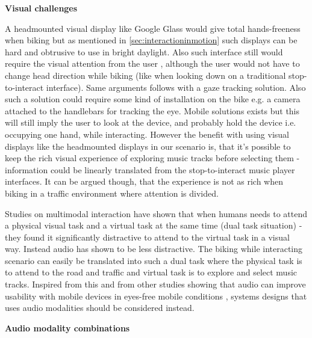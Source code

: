 \textbf{Visual challenges}

A headmounted visual display like Google Glass would give total hands-freeness when biking but as mentioned in \ref{sec:interactioninmotion} such displays can be hard and obtrusive to use in bright daylight. Also such interface still would require the visual attention from the user \cite{geelhoed_safety_2000}, although the user would not have to change head direction while biking (like when looking down on a traditional stop-to-interact interface). Same arguments follows with a gaze tracking solution. Also such a solution could require some kind of installation on the bike e.g. a camera attached to the handlebars for tracking the eye. Mobile solutions exists \cite{mardanbegi_eye-based_2012} but this will still imply the user to look at the device, and probably hold the device i.e. occupying one hand, while interacting. However the benefit with using visual displays like the headmounted displays in our scenario is, that it's possible to keep the rich visual experience of exploring music tracks before selecting them - information could be linearly translated from the stop-to-interact music player interfaces. It can be argued though, that the experience is not as rich when biking in a traffic environment where attention is divided.

Studies on multimodal interaction \cite{zhao_shared_2013} have shown that when humans needs to attend a physical visual task and a virtual task at the same time (dual task situation) - they found it significantly distractive to attend to the virtual task in a visual way. Instead audio has shown to be less distractive. The biking while interacting scenario can easily be translated into such a dual task where the physical task is to attend to the road and traffic and virtual task is to explore and select music tracks. Inspired from this and from other studies showing that audio can improve usability with mobile devices in eyes-free mobile conditions \cite{brewster_multimodaleyes-freeinteraction_2003}, systems designs that uses audio modalities should be considered instead.

\textbf{Audio modality combinations}

